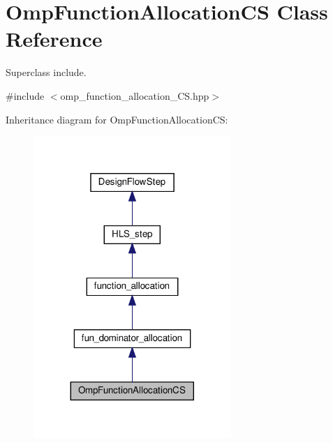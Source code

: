 \hypertarget{classOmpFunctionAllocationCS}{}\section{Omp\+Function\+Allocation\+CS Class Reference}
\label{classOmpFunctionAllocationCS}


Superclass include.  




{\ttfamily \#include $<$omp\+\_\+function\+\_\+allocation\+\_\+\+C\+S.\+hpp$>$}



Inheritance diagram for Omp\+Function\+Allocation\+CS\+:
\nopagebreak
\begin{figure}[H]
\begin{center}
\leavevmode
\includegraphics[width=212pt]{da/dc0/classOmpFunctionAllocationCS__inherit__graph}
\end{center}
\end{figure}


